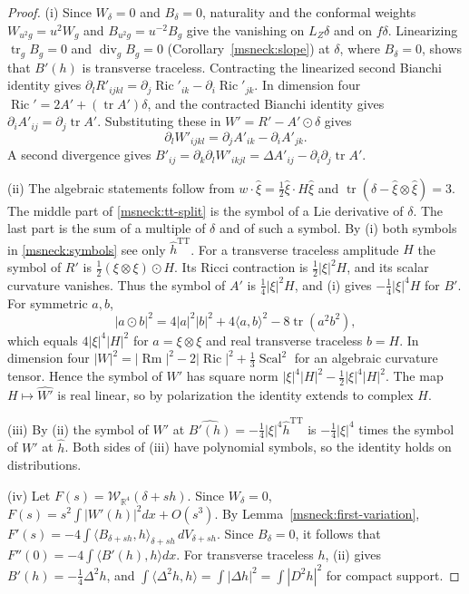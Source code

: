 \documentclass[11pt]{article}
\numberwithin{equation}{section}
\theoremstyle{definition}
\theoremstyle{remark}
\DeclareMathOperator{\Ric}{Ric}
\DeclareMathOperator{\tr}{tr}
\DeclareMathOperator{\Scal}{Scal}
\DeclareMathOperator{\Rm}{Rm}
\begin{document}
\begin{proof}
(i) Since \(W_\delta=0\) and \(B_\delta=0\), naturality and the conformal
weights \(W_{u^2g}=u^2W_g\) and \(B_{u^2g}=u^{-2}B_g\) give the vanishing
on \(L_Z\delta\) and on \(f\delta\). Linearizing \(\tr_gB_g=0\) and
\(\operatorname{div}_gB_g=0\) (Corollary~\ref{msneck:slope}) at \(\delta\),
where \(B_\delta=0\), shows that \(B'(h)\) is transverse traceless.
Contracting the linearized second Bianchi identity gives
\(\partial_lR'_{ijkl}=\partial_j\Ric'_{ik}-\partial_i\Ric'_{jk}\). In
dimension four \(\Ric'=2A'+(\tr A')\delta\), and the contracted Bianchi
identity gives \(\partial_iA'_{ij}=\partial_j\tr A'\). Substituting
these in \(W'=R'-A'\odot\delta\) gives
\[
 \partial_lW'_{ijkl}=\partial_jA'_{ik}-\partial_iA'_{jk}.
\]
A second divergence gives
\(B'_{ij}=\partial_k\partial_lW'_{ikjl}=\Delta A'_{ij}-\partial_i\partial_j\tr A'\).

(ii) The algebraic statements follow from
\(w\cdot\hat\xi=\tfrac12\hat\xi\cdot H\hat\xi\) and
\(\tr(\delta-\hat\xi\otimes\hat\xi)=3\). The middle part of
\eqref{msneck:tt-split} is the symbol of a Lie derivative of \(\delta\).
The last part is the sum of a multiple of \(\delta\) and of such a
symbol. By (i) both symbols in \eqref{msneck:symbols} see only
\(\hat h^{\mathrm{TT}}\). For a transverse traceless amplitude \(H\) the
symbol of \(R'\) is \(\tfrac12(\xi\otimes\xi)\odot H\). Its Ricci
contraction is \(\tfrac12|\xi|^2H\), and its scalar curvature vanishes.
Thus the symbol of \(A'\) is \(\tfrac14|\xi|^2H\), and (i) gives
\(-\tfrac14|\xi|^4H\) for \(B'\). For symmetric \(a,b\),
\begin{equation}\label{msneck:kn-norm}
 |a\odot b|^2=4|a|^2|b|^2+4\langle a,b\rangle^2-8\tr(a^2b^2),
\end{equation}
which equals \(4|\xi|^4|H|^2\) for \(a=\xi\otimes\xi\) and real
transverse traceless \(b=H\). In dimension four
\(|W|^2=|\Rm|^2-2|\Ric|^2+\tfrac13\Scal^2\) for an algebraic curvature
tensor. Hence the symbol of \(W'\) has square norm
\(|\xi|^4|H|^2-\tfrac12|\xi|^4|H|^2\). The map \(H\mapsto\widehat{W'}\)
is real linear, so by polarization the identity extends to complex
\(H\).

(iii) By (ii) the symbol of \(W'\) at
\(\widehat{B'(h)}=-\tfrac14|\xi|^4\hat h^{\mathrm{TT}}\) is \(-\tfrac14|\xi|^4\)
times the symbol of \(W'\) at \(\hat h\). Both sides of (iii) have
polynomial symbols, so the identity holds on distributions.

(iv) Let \(F(s)=\mathcal W_{\mathbb R^4}(\delta+sh)\). Since \(W_\delta=0\),
\(F(s)=s^2\int|W'(h)|^2dx+O(s^3)\). By Lemma~\ref{msneck:first-variation},
\(F'(s)=-4\int\langle B_{\delta+sh},h\rangle_{\delta+sh}\,dV_{\delta+sh}\).
Since \(B_\delta=0\), it follows that \(F''(0)=-4\int\langle B'(h),h\rangle dx\).
For transverse traceless \(h\), (ii) gives \(B'(h)=-\tfrac14\Delta^2h\), and
\(\int\langle\Delta^2h,h\rangle=\int|\Delta h|^2=\int|D^2h|^2\) for
compact support.
\end{proof}
\end{document}
